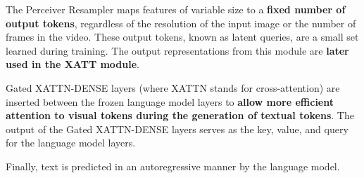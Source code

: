 The Perceiver Resampler maps features of variable size to a \textbf{fixed number of output tokens}, regardless of the resolution of the input image or the number of frames in the video. These output tokens, known as latent queries, are a small set learned during training. The output representations from this module are \textbf{later used in the XATT module}.

Gated XATTN-DENSE layers (where XATTN stands for cross-attention) are inserted between the frozen language model layers to \textbf{allow more efficient attention to visual tokens during the generation of textual tokens}. The output of the Gated XATTN-DENSE layers serves as the key, value, and query for the language model layers.

Finally, text is predicted in an autoregressive manner by the language model. 

